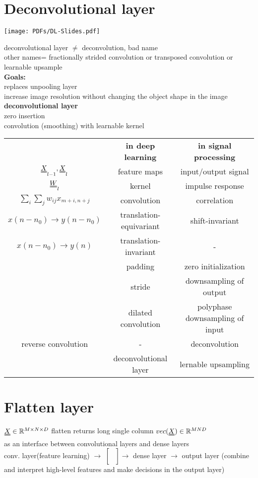 \section{Deconvolutional layer}
\texttt{[image: PDFs/DL-Slides.pdf]}

deconvolutional layer  $  \neq $ deconvolution, bad name \\
other names= fractionally strided convolution or transposed convolution or learnable upsample\\
\textbf{Goals:}\\
\textbullet replaces unpooling layer \\
\textbullet increase image resolution without changing the object shape in the image \\
\textbf{deconvolutional layer}\\
\textbullet zero insertion \\
\textbullet convolution (smoothing) with learnable kernel\\
\begin{tabular}{ccc}
	&\textbf{ in deep learning} & \textbf{in signal processing}\\
$ \X_{l-1} , \X_l  $ & feature maps & input/output signal\\
$  \W_l  $ & kernel & impulse response \\
 $ \sum_{i} \sum_j w _{ij} x_{m+i, n+j}   $ & convolution & correlation \\
 $  x(n-n_0 ) \rightarrow y (n-n_0) $ & translation-equivariant & shift-invariant \\
 $  x(n-n_0 ) \rightarrow y(n) $ & translation-invariant & - \\
 & padding & zero initialization \\
  & stride & downsampling of output \\
  & dilated convolution & polyphase downsampling of input \\
  reverse convolution & - & deconvolution \\
   & deconvolutional layer & lernable upsampling
\end{tabular}
\section{Flatten layer}
$ \X \in \R^{M \times N \times D}  $ flatten returns long single column $ vec(\X) \in \R^{MND} $\\
as an interface between convolutional layers and dense layers \\
conv. layer(feature learning) $ \rightarrow $ $\left[ \begin{matrix}
\\
\\
\\
\\
\end{matrix} \right] \rightarrow$  dense layer $ \rightarrow $ output layer (combine and interpret high-level features and make decisions in the output layer)
